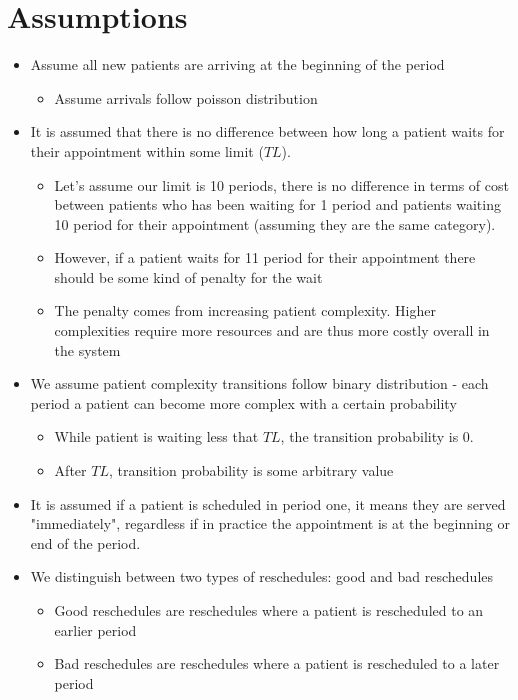 \documentclass{article}
\begin{document}
\section{Assumptions} 
\begin{itemize}
	\item Assume all new patients are arriving at the beginning of the period 
	\begin{itemize}
		\item Assume arrivals follow poisson distribution
	\end{itemize}		
	
	\item It is assumed that there is no difference between how long a patient waits for their appointment within some limit ($TL$). 
	\begin{itemize}
		\item Let's assume our limit is 10 periods, there is no difference in terms of cost between patients who has been waiting for 1 period and patients waiting 10 period for their appointment (assuming they are the same category).  
		\item However, if a patient waits for 11 period for their appointment there should be some kind of penalty for the wait
		\item The penalty comes from increasing patient complexity. Higher complexities require more resources and are thus more costly overall in the system
	\end{itemize}		
	
	\item We assume patient complexity transitions follow binary distribution - each period a patient can become more complex with a certain probability
	\begin{itemize}
		\item While patient is waiting less that $TL$, the transition probability is 0.
		\item After $TL$, transition probability is some arbitrary value
	\end{itemize}
	
	\item It is assumed if a patient is scheduled in period one, it means they are served "immediately", regardless if in practice the appointment is at the beginning or end of the period.
	\item We distinguish between two types of reschedules: good and bad reschedules
	\begin{itemize}
		\item Good reschedules are reschedules where a patient is rescheduled to an earlier period
		\item Bad reschedules are reschedules where a patient is rescheduled to a later period
	\end{itemize}


\end{itemize}
\end{document}
